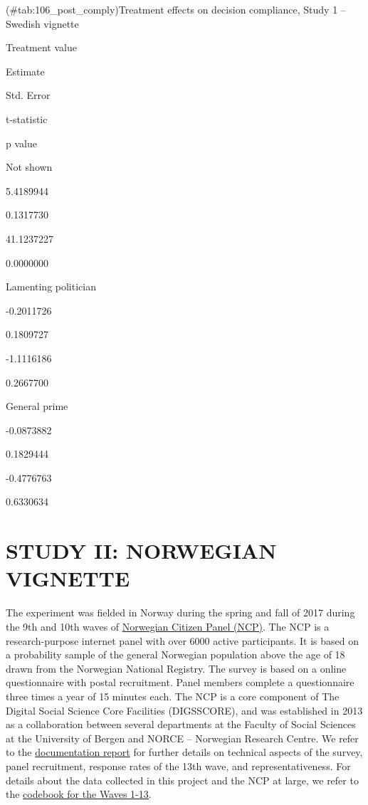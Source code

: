 \documentclass[]{book}
\begin{document}
(\#tab:106\_post\_comply)Treatment effects on decision compliance, Study
1 -- Swedish vignette

Treatment value

Estimate

Std. Error

t-statistic

p value

Not shown

5.4189944

0.1317730

41.1237227

0.0000000

Lamenting politician

-0.2011726

0.1809727

-1.1116186

0.2667700

General prime

-0.0873882

0.1829444

-0.4776763

0.6330634

\part{STUDY II: NORWEGIAN
VIGNETTE}\label{part-study-ii-norwegian-vignette}

The experiment was fielded in Norway during the spring and fall of 2017
during the 9th and 10th waves of
\href{https://www.uib.no/medborger}{Norwegian Citizen Panel (NCP)}. The
NCP is a research-purpose internet panel with over 6000 active
participants. It is based on a probability sample of the general
Norwegian population above the age of 18 drawn from the Norwegian
National Registry. The survey is based on a online questionnaire with
postal recruitment. Panel members complete a questionnaire three times a
year of 15 minutes each. The NCP is a core component of The Digital
Social Science Core Facilities (DIGSSCORE), and was established in 2013
as a collaboration between several departments at the Faculty of Social
Sciences at the University of Bergen and NORCE -- Norwegian Research
Centre. We refer to the
\href{Data/ncp-wave13-documentation.pdf}{documentation report} for
further details on technical aspects of the survey, panel recruitment,
response rates of the 13th wave, and representativeness. For details
about the data collected in this project and the NCP at large, we refer
to the \href{Data/ncp-wave13-codebook.pdf}{codebook for the Waves 1-13}.
\end{document}
